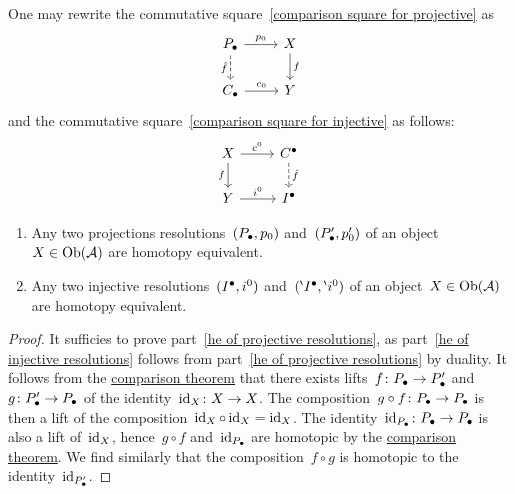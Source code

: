 \begin{remark*}
  One may rewrite the commutative square~\eqref{comparison square for projective} as
  \[
    \begin{tikzcd}
        \Pcc
        \arrow{r}[above]{p_0}
        \arrow[dashed]{d}[left]{\hat{f}}
      & X
        \arrow{d}[right]{f}
      \\
        \Ccc
        \arrow{r}[above]{c_0}
      & Y
    \end{tikzcd}
  \]
  and the commutative square~\eqref{comparison square for injective} as follows:
  \[
    \begin{tikzcd}
        X
        \arrow{r}[above]{c^0}
        \arrow{d}[left]{f}
      & \Cccc
        \arrow[dashed]{d}[right]{\hat{f}}
      \\
        Y
        \arrow{r}[above]{i^0}
      & \Iccc
    \end{tikzcd}
  \]
\end{remark*}


\begin{corollary*}
  \leavevmode
  \begin{enumerate}
    \item
      \label{he of projective resolutions}
      Any two projections resolutions~$(P_\bullet, p_0)$ and~$(P_\bullet', p'_0)$ of an object~$X \in \operatorname{Ob}(\mathcal{A})$ are homotopy equivalent.
    \item
      \label{he of injective resolutions}
      Any two injective resolutions~$(I^\bullet, i^0)$ and~$({}^{\backprime}I^\bullet, {}^{\backprime} i^0)$ of an object~$X \in \operatorname{Ob}(\mathcal{A})$ are homotopy equivalent.
  \end{enumerate}
\end{corollary*}


\begin{proof}
  It sufficies to prove part~\ref*{he of projective resolutions}, as part~\ref*{he of injective resolutions} follows from part~\ref*{he of projective resolutions} by duality.
  It follows from the \hyperref[comparison theorem]{comparison theorem} that there exists lifts~$f \colon P_\bullet \to P_\bullet'$ and~$g \colon P_\bullet' \to P_\bullet$ of the identity~$\operatorname{id}_X \colon X \to X$.
  The composition~$g \circ f \colon P_\bullet \to P_\bullet$ is then a lift of the composition~$\operatorname{id}_X \circ \operatorname{id}_X = \operatorname{id}_X$.
  The identity~$\operatorname{id}_{P_\bullet} \colon P_\bullet \to P_\bullet$ is also a lift of~$\operatorname{id}_X$, hence~$g \circ f$ and~$\operatorname{id}_{P_\bullet}$ are homotopic by the \hyperref[comparison theorem]{comparison theorem}.
  We find similarly that the composition~$f \circ g$ is homotopic to the identity~$\operatorname{id}_{P_\bullet'}$.
\end{proof}


